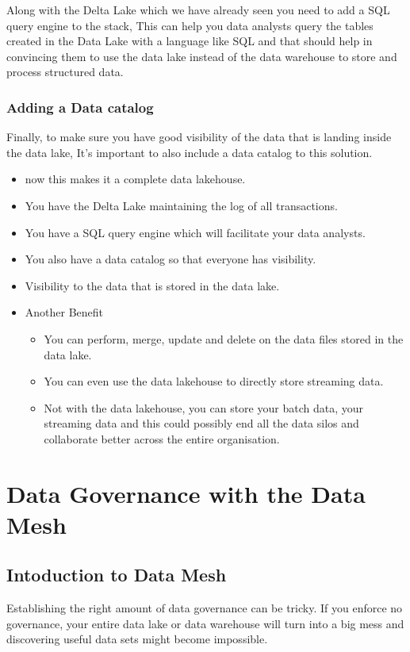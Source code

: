\documentclass[a4paper, 11pt]{book}
\begin{document}
    Along with the Delta Lake which we have already seen you need to add a SQL query engine to the stack,
    This can help you data analysts query the tables created in the Data Lake with a language like SQL and that should help in convincing them to use the data lake instead of the data warehouse to store and process structured data.

    \subsubsection{Adding a Data catalog}
    Finally, to make sure you have good visibility of the data that is landing inside the data lake, It's important to also include a data catalog to this solution.
    \begin{itemize}
        \item now this makes it a complete data lakehouse.
        \item You have the Delta Lake maintaining the log of all transactions.
        \item You have a SQL query engine which will facilitate your data analysts.
        \item You also have a data catalog so that everyone has visibility.
        \item Visibility to the data that is stored in the data lake.
        \item Another Benefit \begin{itemize}
                                  \item You can perform, merge, update and delete on the data files stored in the data lake.
                                  \item You can even use the data lakehouse to directly store streaming data.
                                  \item Not with the data lakehouse, you can store your batch data, your streaming data and this could possibly end all the data silos and collaborate better across the entire organisation.
        \end{itemize}
    \end{itemize}


    \section{Data Governance with the Data Mesh}

    \subsection{Intoduction to Data Mesh}
    Establishing the right amount of data governance can be tricky.
    If you enforce no governance, your entire data lake or data warehouse will turn into a big mess and discovering useful data sets might become impossible.
\end{document}
